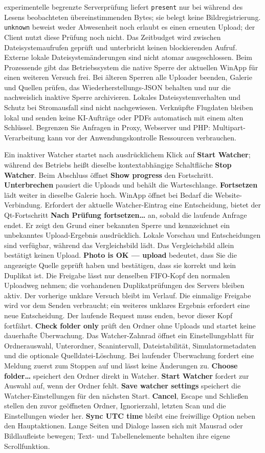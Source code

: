\documentclass[11pt,a4paper]{article}
\newcommand{\ui}[1]{\textbf{#1}}
\begin{document}
experimentelle begrenzte Serverprüfung liefert \texttt{present} nur bei während
des Lesens beobachteten übereinstimmenden Bytes; sie belegt keine
Bildregistrierung. \texttt{unknown} beweist weder Abwesenheit noch erlaubt es
einen erneuten Upload; der Client nutzt diese Prüfung noch nicht. Das Zeitbudget
wird zwischen Dateisystemaufrufen geprüft und unterbricht keinen blockierenden
Aufruf. Externe lokale Dateisystemänderungen sind nicht atomar ausgeschlossen.
Beim Prozessende gibt das Betriebssystem die native Sperre der aktuellen
WinApp für einen weiteren Versuch frei. Bei älteren Sperren alle Uploader
beenden, Galerie und Quellen prüfen, das Wiederherstellungs-JSON behalten und
nur die nachweislich inaktive Sperre archivieren. Lokales Dateisystemverhalten und Schutz bei
Stromausfall sind nicht nachgewiesen. Verknüpfte Flugdaten bleiben lokal und
senden keine KI-Aufträge oder PDFs automatisch mit einem alten Schlüssel.
Begrenzen Sie Anfragen in Proxy, Webserver und PHP: Multipart-Verarbeitung
kann vor der Anwendungskontrolle Ressourcen verbrauchen.

Ein inaktiver Watcher startet nach ausdrücklichem Klick auf \ui{Start Watcher}; während des Betriebs
heißt dieselbe kontextabhängige Schaltfläche \ui{Stop Watcher}.
Beim Abschluss öffnet \ui{Show progress} den Fortschritt. \ui{Unterbrechen}
pausiert die Uploads und behält die Warteschlange. \ui{Fortsetzen} lädt weiter
in dieselbe Galerie hoch. WinApp öffnet bei Bedarf die Website-Verbindung.
Erfordert der aktuelle Watcher-Eintrag eine Entscheidung, bietet der
Qt-Fortschritt \ui{Nach Prüfung fortsetzen…} an, sobald die laufende Anfrage
endet. Er zeigt den Grund einer bekannten Sperre und kennzeichnet ein
unbekanntes Upload-Ergebnis ausdrücklich. Lokale Vorschau und Entscheidungen
sind verfügbar, während das Vergleichsbild lädt. Das Vergleichsbild allein
bestätigt keinen Upload.
\ui{Photo is OK — upload} bedeutet, dass Sie
die angezeigte Quelle geprüft haben und bestätigen, dass sie korrekt und kein
Duplikat ist. Die Freigabe lässt nur denselben FIFO-Kopf den normalen Uploadweg
nehmen; die vorhandenen Duplikatprüfungen des Servers bleiben aktiv.
Der vorherige unklare Versuch bleibt im Verlauf. Die einmalige Freigabe wird
vor dem Senden verbraucht; ein weiteres unklares Ergebnis erfordert eine neue
Entscheidung. Der laufende Request muss enden, bevor dieser Kopf fortfährt.
\ui{Check folder only} prüft den Ordner ohne Uploads und startet keine
dauerhafte
Überwachung. Das Watcher-Zahnrad öffnet ein Einstellungsblatt für Ordnerauswahl,
Unterordner, Scanintervall, Dateistabilität, Simulatormetadaten und die
optionale
Quelldatei-Löschung.
Bei laufender Überwachung fordert eine Meldung zuerst zum Stoppen auf und lässt
keine Änderungen zu. \ui{Choose folder…} speichert den Ordner direkt in
Watcher. \ui{Start Watcher} fordert zur Auswahl auf, wenn der Ordner fehlt.
\ui{Save watcher settings} speichert die Watcher-Einstellungen für den
nächsten Start. \ui{Cancel}, Escape und Schließen stellen den zuvor geöffneten Ordner,
Ignorierzahl, letzten Scan und die Einstellungen wieder her. \ui{Sync UTC time}
bleibt eine freiwillige Option neben den Hauptaktionen.
Lange Seiten und Dialoge lassen sich mit Mausrad oder Bildlaufleiste bewegen;
Text- und Tabellenelemente behalten ihre eigene Scrollfunktion.
\end{document}
